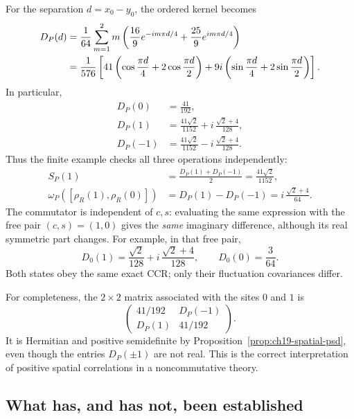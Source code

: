 For the separation $d=x_0-y_0$, the ordered kernel becomes
\begin{align}
 D_P(d)
 &=\frac1{64}\sum_{m=1}^{2}m
   \left(\frac{16}{9}e^{-i m\pi d/4}
        +\frac{25}{9}e^{i m\pi d/4}\right)\notag\\
 &=\frac1{576}\left[
  41\left(\cos\frac{\pi d}{4}
            +2\cos\frac{\pi d}{2}\right)
  +9i\left(\sin\frac{\pi d}{4}
            +2\sin\frac{\pi d}{2}\right)\right].
 \label{eq:ch19-spatial-example-finite}
\end{align}
In particular,
\begin{align}
 D_P(0)&=\frac{41}{192},
 \label{eq:ch19-spatial-example-diagonal}\\
 D_P(1)&=\frac{41\sqrt2}{1152}
          +i\,\frac{\sqrt2+4}{128},
 \label{eq:ch19-spatial-example-d1}\\
 D_P(-1)&=\frac{41\sqrt2}{1152}
          -i\,\frac{\sqrt2+4}{128}.
 \label{eq:ch19-spatial-example-dminus1}
\end{align}
Thus the finite example checks all three operations independently:
\begin{align*}
 S_P(1)&=\frac{D_P(1)+D_P(-1)}2
       =\frac{41\sqrt2}{1152},\\
 \omega_P([\rho_R(1),\rho_R(0)])
 &=D_P(1)-D_P(-1)
   =i\,\frac{\sqrt2+4}{64}.
\end{align*}
The commutator is independent of $c,s$: evaluating the same expression
with the free pair $(c,s)=(1,0)$ gives the \emph{same} imaginary
difference, although its real symmetric part changes.
For example, in that free pair,
\begin{equation}
 D_0(1)=\frac{\sqrt2}{128}
          +i\,\frac{\sqrt2+4}{128},
 \qquad D_0(0)=\frac3{64}.
 \label{eq:ch19-spatial-example-free}
\end{equation}
Both states obey the same exact CCR; only their fluctuation
covariances differ.

For completeness, the $2\times2$ matrix associated with the sites
$0$ and $1$ is
\[
 \begin{pmatrix}
  41/192&D_P(-1)\\
  D_P(1)&41/192
 \end{pmatrix}.
\]
It is Hermitian and positive semidefinite by
Proposition~\ref{prop:ch19-spatial-psd}, even though the entries
$D_P(\pm1)$ are not real.  This is the correct interpretation of
positive spatial correlations in a noncommutative theory.

\subsection{What has, and has not, been established}

